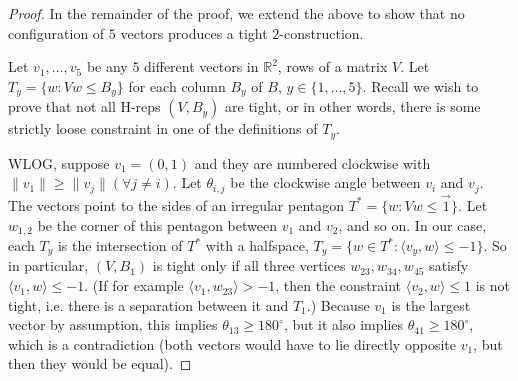 \documentclass[anon,12pt]{colt2019}
\newcommand{\reals}{\mathbb{R}}
\newcommand{\inprod}[2]{\langle #1, #2 \rangle}%
\begin{document}
\begin{proof}
In the remainder of the proof, we extend the above to show that no configuration of $5$ vectors produces a tight $2$-construction.

Let $v_1,\dots,v_5$ be any $5$ different vectors in $\reals^2$, rows of a matrix $V$.
Let $T_y = \{w : Vw \leq B_y\}$ for each column $B_y$ of $B$, $y\in\{1,\dots,5\}$.
Recall we wish to prove that not all H-reps $(V,B_y)$ are tight, or in other words, there is some strictly loose constraint in one of the definitions of $T_y$.

WLOG, suppose $v_1 = (0,1)$ and they are numbered clockwise with $\|v_1\| \geq \|v_j\| (\forall j \neq i)$.
Let $\theta_{i,j}$ be the clockwise angle between $v_i$ and $v_j$.
The vectors point to the sides of an irregular pentagon $T^* = \{w : Vw \leq \vec{1}\}$.
Let $w_{1,2}$ be the corner of this pentagon between $v_1$ and $v_2$, and so on.
In our case, each $T_y$ is the intersection of $T^*$ with a halfspace, $T_y = \{w \in T^* : \inprod{v_y}{w} \leq -1\}$.
So in particular, $(V,B_1)$ is tight only if all three vertices $w_{23},w_{34},w_{45}$ satisfy $\inprod{v_1}{w} \leq -1$.
(If for example $\inprod{v_1}{w_{23}} > -1$, then the constraint $\inprod{v_2}{w} \leq 1$ is not tight, i.e. there is a separation between it and $T_1$.)
Because $v_1$ is the largest vector by assumption, this implies $\theta_{13} \geq 180^{\circ}$, but it also implies $\theta_{41} \geq 180^{\circ}$, which is a contradiction (both vectors would have to lie directly opposite $v_1$, but then they would be equal).
\end{proof}

%
\end{document}
